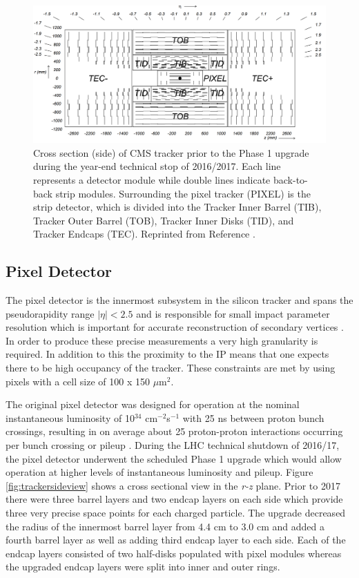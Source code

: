 \begin{figure}[h]
	\centering
	\includegraphics[width=1.0\linewidth]{Figures/TrackerLayout_v2}
	\caption{Cross section (side) of CMS tracker prior to the Phase 1 upgrade during the year-end technical stop of 2016/2017. Each line represents a detector module while double lines indicate back-to-back strip modules. Surrounding the pixel tracker (PIXEL) is the strip detector, which is divided into the Tracker Inner Barrel (TIB), Tracker Outer Barrel (TOB), Tracker Inner Disks (TID), and Tracker Endcaps (TEC). Reprinted from Reference \cite{Chatrchyan:1704291}.}
	\label{fig:trackerlayoutv2}
\end{figure}

\subsection{Pixel Detector}
The pixel detector is the innermost subsystem in the silicon tracker and spans the pseudorapidity range $|\eta|< 2.5$ and is responsible for small impact parameter resolution which is important for accurate reconstruction of secondary vertices \cite{Collaboration_2008}.  In order to produce these precise measurements a very high granularity is required.  In addition to this the proximity to the IP means that one expects there to be high occupancy of the tracker.  These constraints are met by using pixels with a cell size of 100 x 150 $\mu$m$^{2}$.  

The original pixel detector was designed for operation at the nominal instantaneous luminosity of 10$^{34}$ cm$^{-2}$s$^{-1}$ with 25 ns between proton bunch crossings, resulting in on average about 25 proton-proton interactions occurring per bunch crossing or pileup \cite{Chatrchyan:1704291}.  During the LHC technical shutdown of 2016/17, the pixel detector underwent the scheduled Phase 1 upgrade which would allow operation at higher levels of instantaneous luminosity and pileup.  Figure \ref{fig:trackersideview} shows a cross sectional view in the \textit{r-z} plane.  Prior to 2017 there were three barrel layers and two endcap layers on each side which provide three very precise space points for each charged particle.  The upgrade decreased the radius of the innermost barrel layer from 4.4 cm to 3.0 cm and added a fourth barrel layer as well as adding third endcap layer to each side.  Each of the endcap layers consisted of two half-disks populated with pixel modules whereas the upgraded endcap layers were split into inner and outer rings. \cite{Dominguez:1481838}

